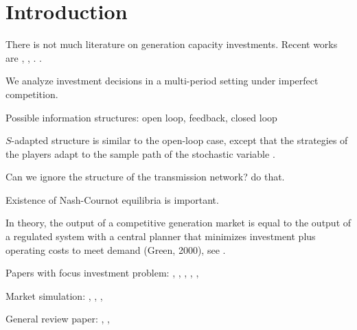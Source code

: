 \section{Introduction}


There is not much literature on generation capacity investments. Recent works are \cite{Chuang2001}, \cite{Ventosa2002}, \cite{Ehrenmann2004}. \cite{Murphy2005}.

We analyze investment decisions in a multi-period setting under imperfect competition.

Possible information structures: open loop, feedback, closed loop

$S$-adapted structure is similar to the open-loop case, except that the strategies of the players adapt to the sample path of the stochastic variable \citep[see][pg. 128]{Pineau2003}.

Can we ignore the structure of the transmission network? \cite{Pineau2003} do that.

Existence of Nash-Cournot equilibria is important.

In theory, the output of a competitive generation market is equal to the output of a regulated system with a central planner that minimizes investment plus operating costs to meet demand (Green, 2000), see \citep[see][pg. 111]{Rothwell2003}.

Papers with focus investment problem: \cite{Pineau2003}, \cite{Murphy2005}, \cite{Genc2007}, \cite{Kiesling2007}, \cite{Barmack2007}, \cite{Sauma2006}

Market simulation: \cite{Torre2003}, \cite{Valenzuela2007}, \cite{Hobbs2001},\cite{Otero-Novas2000}

General review paper: \cite{Neuhoff2005}, \cite{Ventosa2005}, \cite{Kahn1998}